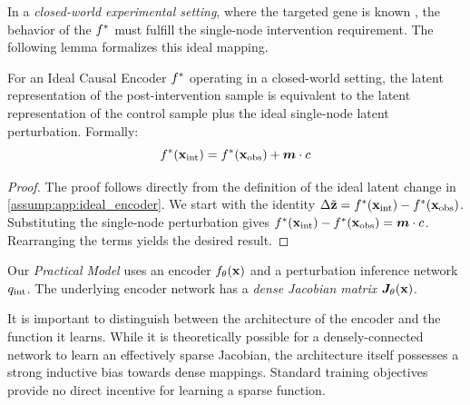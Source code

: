 In a \emph{closed-world experimental setting}, where the targeted gene is known \apriori{}, the behavior of the $f^*$ must fulfill the single-node intervention requirement.
The following lemma formalizes this ideal mapping.

\begin{lemma}
\label{lemma:app:ideal_equivalence}
For an Ideal Causal Encoder $f^*$ operating in a closed-world setting, the latent representation of the post-intervention sample is equivalent to the latent representation of the control sample plus the ideal single-node latent perturbation.
Formally:
\begin{equation}
    f^*({\mathbf{x}}_{\text{int}}) = f^*({\mathbf{x}}_{\text{obs}}) + {\bm{m}} \cdot c
\end{equation}
\end{lemma}

\begin{proof}
The proof follows directly from the definition of the ideal latent change in \cref{assump:app:ideal_encoder}.
We start with the identity $\Delta\tilde{{\mathbf{z}}} = f^*({\mathbf{x}}_{\text{int}}) - f^*({\mathbf{x}}_{\text{obs}})$.
Substituting the single-node perturbation gives $f^*({\mathbf{x}}_{\text{int}}) - f^*({\mathbf{x}}_{\text{obs}}) = {\bm{m}} \cdot c$.
Rearranging the terms yields the desired result.
\end{proof}

\begin{assumption}
\label{assump:app:practical_model}
Our \emph{Practical Model} uses an encoder $f_\theta({\mathbf{x}})$ and a perturbation inference network $q_{\text{int}}$.
The underlying encoder network has a \emph{dense Jacobian matrix} ${\bm{J}}_\theta({\mathbf{x}})$.
\end{assumption}

\begin{remark}
It is important to distinguish between the architecture of the encoder and the function it learns.
While it is theoretically possible for a densely-connected network to learn an effectively sparse Jacobian, the architecture itself possesses a strong inductive bias towards dense mappings.
Standard training objectives provide no direct incentive for learning a sparse function.
\end{remark}

